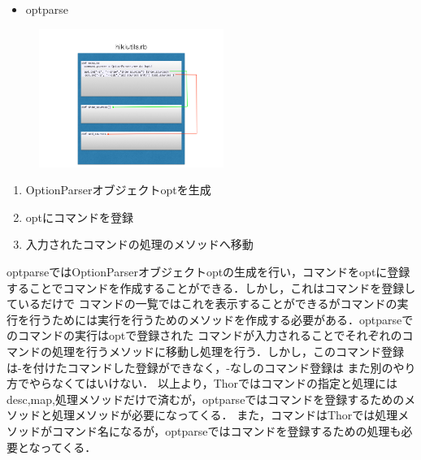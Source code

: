 \begin{itemize}
\item optparse
\end{itemize}
\begin{figure}[htbp]\begin{center}
\includegraphics[width=6cm,bb=0 0 442 500]{../figs/./hikiutils_yamane.005.jpg}
\caption{}
\label{default}\end{center}\end{figure}
\begin{enumerate}
\item OptionParserオブジェクトoptを生成
\item optにコマンドを登録
\item 入力されたコマンドの処理のメソッドへ移動
\end{enumerate}
optparseではOptionParserオブジェクトoptの生成を行い，コマンドをoptに登録することでコマンドを作成することができる．しかし，これはコマンドを登録しているだけで
コマンドの一覧ではこれを表示することができるがコマンドの実行を行うためには実行を行うためのメソッドを作成する必要がある．optparseでのコマンドの実行はoptで登録された
コマンドが入力されることでそれぞれのコマンドの処理を行うメソッドに移動し処理を行う．しかし，このコマンド登録は-を付けたコマンドした登録ができなく，-なしのコマンド登録は
また別のやり方でやらなくてはいけない．
以上より，Thorではコマンドの指定と処理にはdesc,map,処理メソッドだけで済むが，optparseではコマンドを登録するためのメソッドと処理メソッドが必要になってくる．
また，コマンドはThorでは処理メソッドがコマンド名になるが，optparseではコマンドを登録するための処理も必要となってくる．

